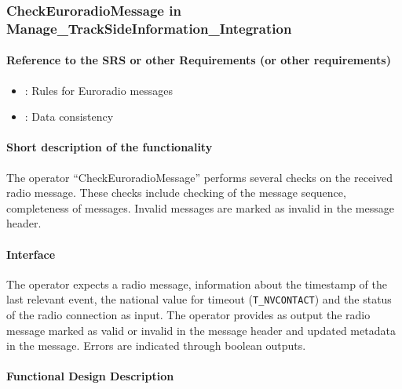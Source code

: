 \subsubsection{CheckEuroradioMessage in Manage\_TrackSideInformation\_Integration}%
\paragraph{Reference to the SRS or other Requirements (or other requirements)}
\begin{itemize}
 \item \cite[Chapt.~8.4.4]{subset-026}: Rules for Euroradio messages
 \item \cite[Chapt.~3.16]{subset-026}: Data consistency
\end{itemize}

\paragraph{Short description of the functionality}

The operator ``CheckEuroradioMessage'' performs several checks on the received radio message. These checks include checking of the message sequence, completeness of messages. Invalid messages are marked as invalid in the message header.

\paragraph{Interface}
The operator expects a radio message, information about the timestamp of the last relevant event, the national value for timeout (\texttt{T\_NVCONTACT}) and the status of the radio connection as input. The operator provides as output the radio message marked as valid or invalid in the message header and updated metadata in the message. Errors are indicated through boolean outputs.

\paragraph{Functional Design Description}

